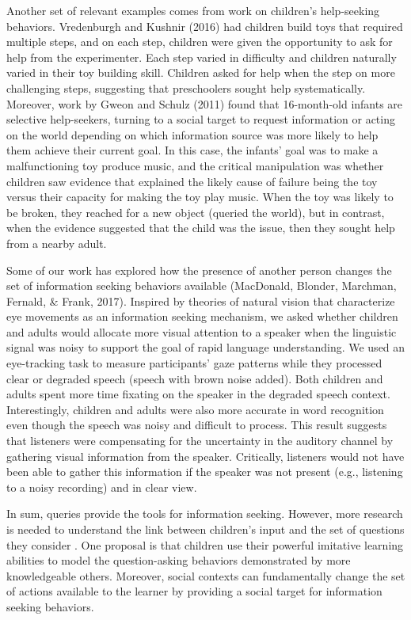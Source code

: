 \documentclass[english,floatsintext,man]{apa6}
\theoremstyle{definition}
\theoremstyle{definition}
\theoremstyle{definition}
\theoremstyle{remark}
\begin{document}
Another set of relevant examples comes from work on children's
help-seeking behaviors. Vredenburgh and Kushnir (2016) had children
build toys that required multiple steps, and on each step, children were
given the opportunity to ask for help from the experimenter. Each step
varied in difficulty and children naturally varied in their toy building
skill. Children asked for help when the step on more challenging steps,
suggesting that preschoolers sought help systematically. Moreover, work
by Gweon and Schulz (2011) found that 16-month-old infants are selective
help-seekers, turning to a social target to request information or
acting on the world depending on which information source was more
likely to help them achieve their current goal. In this case, the
infants' goal was to make a malfunctioning toy produce music, and the
critical manipulation was whether children saw evidence that explained
the likely cause of failure being the toy versus their capacity for
making the toy play music. When the toy was likely to be broken, they
reached for a new object (queried the world), but in contrast, when the
evidence suggested that the child was the issue, then they sought help
from a nearby adult.

Some of our work has explored how the presence of another person changes
the set of information seeking behaviors available (MacDonald, Blonder,
Marchman, Fernald, \& Frank, 2017). Inspired by theories of natural
vision that characterize eye movements as an information seeking
mechanism, we asked whether children and adults would allocate more
visual attention to a speaker when the linguistic signal was noisy to
support the goal of rapid language understanding. We used an
eye-tracking task to measure participants' gaze patterns while they
processed clear or degraded speech (speech with brown noise added). Both
children and adults spent more time fixating on the speaker in the
degraded speech context. Interestingly, children and adults were also
more accurate in word recognition even though the speech was noisy and
difficult to process. This result suggests that listeners were
compensating for the uncertainty in the auditory channel by gathering
visual information from the speaker. Critically, listeners would not
have been able to gather this information if the speaker was not present
(e.g., listening to a noisy recording) and in clear view.

In sum, queries provide the tools for information seeking. However, more
research is needed to understand the link between children's input and
the set of questions they consider . One proposal is that children use
their powerful imitative learning abilities to model the question-asking
behaviors demonstrated by more knowledgeable others. Moreover, social
contexts can fundamentally change the set of actions available to the
learner by providing a social target for information seeking behaviors.
\end{document}

